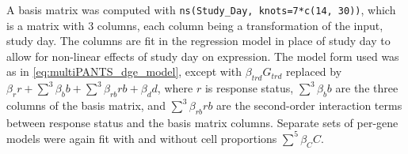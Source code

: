 A basis matrix \autocite{perperoglou2019ReviewSplineFunction} was computed with \texttt{ns(Study\_Day, knots=7*c(14, 30))},
which is a matrix with 3 columns, each column being a transformation of the input, study day.
The columns are fit in the regression model in place of study day to allow for non-linear effects of study day on expression.
The model form used was as in \cref{eq:multiPANTS_dge_model},
except with $\beta_{trd} G_{trd}$
replaced by $\beta_r r + \sum_{}^{3}{\beta_b b} + \sum_{}^{3}{\beta_{rb} rb} + \beta_d d$,
where $r$ is response status,
$\sum_{}^{3}{\beta_b b}$ are the three columns of the basis matrix,
and $\sum_{}^{3}{\beta_{rb} rb}$ are the second-order interaction terms between response status and the basis matrix columns.
Separate sets of per-gene models were again fit with and without cell proportions $\sum_{}^{5}{\beta_C C}$.

%

